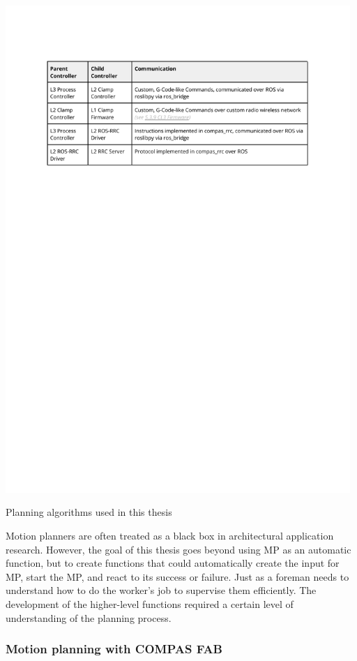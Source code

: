 \begin{table}
    \includegraphics[page=4, trim=25.4mm 200mm 25.4mm 33mm, clip, width=0.98\textwidth]{tables/Tables in Chapter 5.pdf}
    \caption{Planning algorithms used in this thesis}
    \label{table:planning-algorithms-used}
\end{table}

Motion planners are often treated as a black box in architectural application research. However, the goal of this thesis goes beyond using MP as an automatic function, but to create functions that could automatically create the input for MP, start the MP, and react to its success or failure. Just as a foreman needs to understand how to do the worker’s job to supervise them efficiently. The development of the higher-level functions required a certain level of understanding of the planning process.

\subsubsection{Motion planning with COMPAS FAB}
\label{subsubsection:exploration-2-motion-planning-with-compas-fab}


